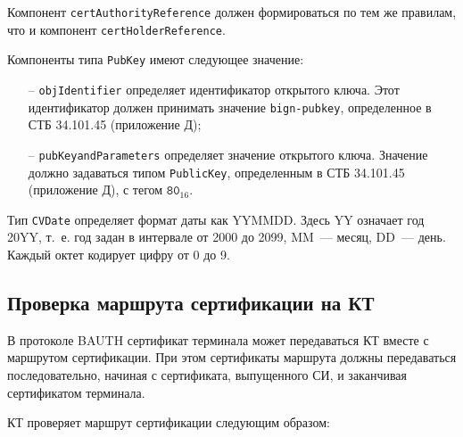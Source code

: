 Компонент \verb|certAuthorityReference| должен формироваться по тем же 
правилам, что и компонент \verb|certHolderReference|. 

Компоненты типа \verb|PubKey| имеют следующее значение:

\begin{itemize}
\item[--]
\verb|objIdentifier| определяет идентификатор открытого ключа. 
Этот идентификатор должен принимать значение \texttt{bign-pubkey}, 
определенное в СТБ 34.101.45 (приложение Д); 

\item[--]
\verb|pubKeyandParameters| определяет значение открытого ключа. 
Значение должно задаваться типом \verb|PublicKey|, 
определенным в СТБ 34.101.45 (приложение Д), с тегом $\texttt{80}_{16}$. 
\end{itemize}

Тип \verb|CVDate| определяет формат даты как YYMMDD. Здесь YY означает год 20YY, 
т.~е. год задан в интервале от 2000 до 2099, MM~--- месяц, DD~--- день. 
Каждый октет кодирует цифру от 0 до 9. 

\subsection{Проверка маршрута сертификации на КТ}\label{CERTS.Path}

В протоколе BAUTH сертификат терминала может передаваться КТ вместе с маршрутом 
сертификации. При этом сертификаты маршрута должны передаваться 
последовательно, начиная с сертификата, выпущенного СИ, и заканчивая 
сертификатом терминала.  

КТ проверяет маршрут сертификации следующим образом:

